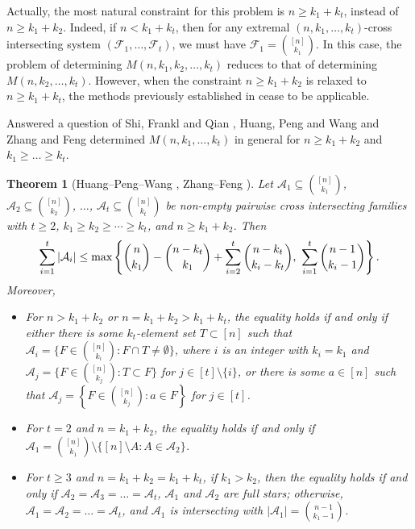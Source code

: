 \documentclass[a4paper,11pt]{article}
\newtheorem{theorem}{Theorem}[section]
\begin{document}
Actually, the most natural constraint for this problem is $n\geq k_1+k_t$, instead of $n\ge k_1 + k_2$.  Indeed, if $n< k_1+k_t$, then for any extremal  $(n, k_1, \dots, k_t)$-cross intersecting system $(\mathcal{F}_1, \dots, \mathcal{F}_t)$, we must have $\mathcal{F}_1={[n]\choose k_1}$.
In this case, the problem of determining $M(n,k_1,k_2,\ldots ,k_t)$ reduces to that of determining $M(n, k_2, \dots, k_t)$.
However, when the constraint $n \ge k_1 + k_2$ is relaxed to $n \ge k_1 + k_t$, the methods previously established in \cite{HPW, ZF2023, HP+, SFQ2020} cease to be applicable.

\iffalse
Answered a question of Shi, Frankl and Qian \cite{SFQ2020}, Huang, Peng and Wang \cite{HPW} and Zhang and Feng \cite{ZF2023} determined  $M(n, k_1,  \dots, k_t)$ in general for $n\geq k_1+k_2$ and $k_1\geq\dots\geq k_t$.

\begin{theorem}[Huang--Peng--Wang \cite{HPW}, Zhang--Feng \cite{ZF2023}]\label{HP}
Let $\mathcal{A}_1\subseteq{[n]\choose k_1}$, $\mathcal{A}_2\subseteq{[n]\choose k_2}$, $\dots$, $\mathcal{A}_t\subseteq{[n]\choose k_t}$ be non-empty pairwise cross intersecting families with $t\geq 2$, $k_1\geq k_2\geq \cdots \geq k_t$, and $n\geq k_1+k_2$. Then
$$
\sum_{i=1}^t{|\mathcal{A}_i|}\leq \textup{max} \left\{{n\choose k_1}-{n-k_t\choose k_1}+\sum_{i=2}^t{{n-k_t\choose k_i-k_t}}, \,\,\sum_{i=1}^t{n-1\choose k_i-1}\right\}.
$$
Moreover,
\begin{itemize}
  \item[(i)] For $n>k_1+k_2$ or $n=k_1+k_2>k_1+k_t$, the equality holds if and only if
 either there is some $k_t$-element set $T\subset [n]$ such that $\mathcal{A}_i=\{F\in {[n]\choose k_i}\colon  F\cap T\ne\emptyset\}$, where $i$ is an integer with $k_i=k_1$ and $\mathcal{A}_j=\{F\in {[n]\choose k_j}: T\subset F\}$ for $j\in [t]\setminus \{i\}$, or  there is some $a\in [n]$ such that $\mathcal{A}_j=\left\{F\in{[n]\choose k_j}\colon  a\in F\right\}$ for  $j\in [t]$.
  \item[(ii)] For $t=2$ and $n=k_1+k_2$,  the equality holds if and only if $\mathcal{A}_1={[n]\choose k_1}\setminus \{[n]\setminus A\colon A\in \mathcal{A}_2\}$.
  \item[(iii)] For $t\geq 3$ and $n=k_1+k_2=k_1+k_t$, if $k_1>k_2$, then the equality holds if and only if $\mathcal{A}_2=\mathcal{A}_3=\dots=\mathcal{A}_t$, $\mathcal{A}_1$ and $\mathcal{A}_2$ are full stars; otherwise,  $\mathcal{A}_1=\mathcal{A}_2=\dots=\mathcal{A}_t$, and $\mathcal{A}_1$ is intersecting with $|\mathcal{A}_1|=\binom{n-1}{k_1-1}$.
\end{itemize}
\end{theorem}
\end{document}
